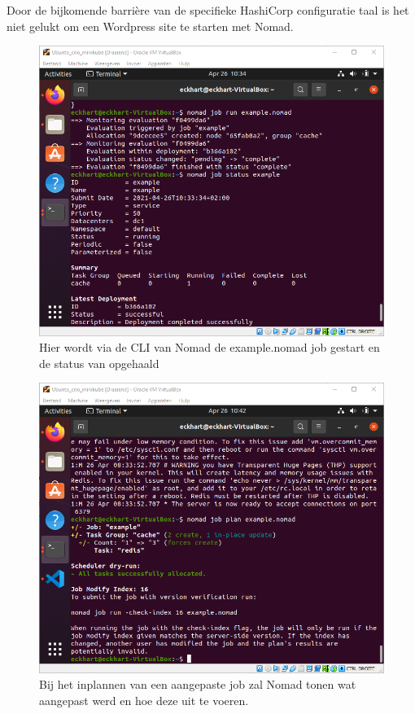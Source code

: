 Door de bijkomende barrière van de specifieke HashiCorp configuratie taal is het niet gelukt om een Wordpress site te starten met Nomad.
\begin{figure}[h]
    \includegraphics[width=\linewidth]{img/nomadrun.png}
    \caption[Een voorbeeld Nomad job]{Hier wordt via de CLI van Nomad de example.nomad job gestart en de status van opgehaald}
    \label{fig:nomadrun}
    \centering
\end{figure}
\begin{figure}[h]
    \includegraphics[width=\linewidth]{img/nomadplan.png}
    \caption[Een aangepaste job plannen met Nomad]{Bij het inplannen van een aangepaste job zal Nomad tonen wat aangepast werd en hoe deze uit te voeren.}
    \label{fig:nomdadplan}
    \centering
\end{figure}
